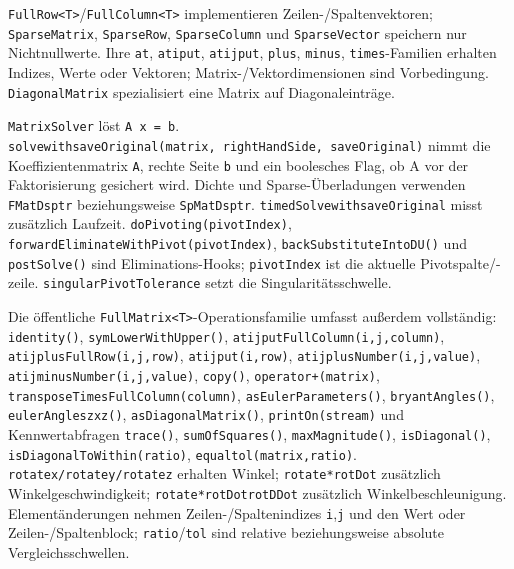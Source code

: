 \documentclass[
  12pt
]{book}
\begin{document}
\texttt{FullRow\textless{}T\textgreater{}}/\texttt{FullColumn\textless{}T\textgreater{}}
implementieren Zeilen-/Spaltenvektoren; \texttt{SparseMatrix},
\texttt{SparseRow}, \texttt{SparseColumn} und \texttt{SparseVector}
speichern nur Nichtnullwerte. Ihre \texttt{at}, \texttt{atiput},
\texttt{atijput}, \texttt{plus}, \texttt{minus}, \texttt{times}-Familien
erhalten Indizes, Werte oder Vektoren; Matrix-/Vektordimensionen sind
Vorbedingung. \texttt{DiagonalMatrix} spezialisiert eine Matrix auf
Diagonaleinträge.

\texttt{MatrixSolver} löst \texttt{A\ x\ =\ b}.
\texttt{solvewithsaveOriginal(matrix,\ rightHandSide,\ saveOriginal)}
nimmt die Koeffizientenmatrix \texttt{A}, rechte Seite \texttt{b} und
ein boolesches Flag, ob A vor der Faktorisierung gesichert wird. Dichte
und Sparse-Überladungen verwenden \texttt{FMatDsptr} beziehungsweise
\texttt{SpMatDsptr}. \texttt{timedSolvewithsaveOriginal} misst
zusätzlich Laufzeit. \texttt{doPivoting(pivotIndex)},
\texttt{forwardEliminateWithPivot(pivotIndex)},
\texttt{backSubstituteIntoDU()} und \texttt{postSolve()} sind
Eliminations-Hooks; \texttt{pivotIndex} ist die aktuelle
Pivotspalte/-zeile. \texttt{singularPivotTolerance} setzt die
Singularitätsschwelle.

Die öffentliche
\texttt{FullMatrix\textless{}T\textgreater{}}-Operationsfamilie umfasst
außerdem vollständig: \texttt{identity()}, \texttt{symLowerWithUpper()},
\texttt{atijputFullColumn(i,j,column)},
\texttt{atijplusFullRow(i,j,row)}, \texttt{atijput(i,row)},
\texttt{atijplusNumber(i,j,value)}, \texttt{atijminusNumber(i,j,value)},
\texttt{copy()}, \texttt{operator+(matrix)},
\texttt{transposeTimesFullColumn(column)}, \texttt{asEulerParameters()},
\texttt{bryantAngles()}, \texttt{eulerAngleszxz()},
\texttt{asDiagonalMatrix()}, \texttt{printOn(stream)} und
Kennwertabfragen \texttt{trace()}, \texttt{sumOfSquares()},
\texttt{maxMagnitude()}, \texttt{isDiagonal()},
\texttt{isDiagonalToWithin(ratio)}, \texttt{equaltol(matrix,ratio)}.
\texttt{rotatex/rotatey/rotatez} erhalten Winkel; \texttt{rotate*rotDot}
zusätzlich Winkelgeschwindigkeit; \texttt{rotate*rotDotrotDDot}
zusätzlich Winkelbeschleunigung. Elementänderungen nehmen
Zeilen-/Spaltenindizes \texttt{i},\texttt{j} und den Wert oder
Zeilen-/Spaltenblock; \texttt{ratio}/\texttt{tol} sind relative
beziehungsweise absolute Vergleichsschwellen.
\end{document}
